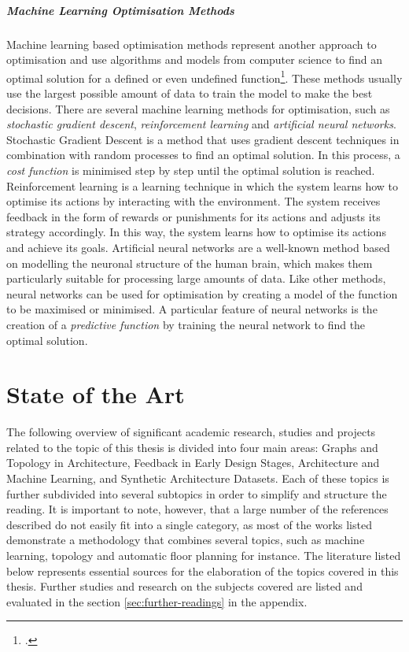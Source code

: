 \documentclass[a4paper, 12pt]{report}
\begin{document}
\paragraph{Machine Learning Optimisation Methods}\label{par:machine-learning-optimisation-methods}

Machine learning based optimisation methods represent another approach to optimisation and use algorithms and models from computer science to find an optimal solution for a defined or even undefined function\footcite{sebestyen2020machine}. These methods usually use the largest possible amount of data to train the model to make the best decisions. There are several machine learning methods for optimisation, such as \textit{stochastic gradient descent}, \textit{reinforcement learning} and \textit{artificial neural networks}. Stochastic Gradient Descent is a method that uses gradient descent techniques in combination with random processes to find an optimal solution. In this process, a \textit{cost function} is minimised step by step until the optimal solution is reached. Reinforcement learning is a learning technique in which the system learns how to optimise its actions by interacting with the environment. The system receives feedback in the form of rewards or punishments for its actions and adjusts its strategy accordingly. In this way, the system learns how to optimise its actions and achieve its goals. Artificial neural networks are a well-known method based on modelling the neuronal structure of the human brain, which makes them particularly suitable for processing large amounts of data. Like other methods, neural networks can be used for optimisation by creating a model of the function to be maximised or minimised. A particular feature of neural networks is the creation of a \textit{predictive function} by training the neural network to find the optimal solution.

\chapter{State of the Art}\label{chap:state-of-the-art}

The following overview of significant academic research, studies and projects related to the topic of this thesis is divided into four main areas: Graphs and Topology in Architecture, Feedback in Early Design Stages, Architecture and Machine Learning, and Synthetic Architecture Datasets. Each of these topics is further subdivided into several subtopics in order to simplify and structure the reading. It is important to note, however, that a large number of the references described do not easily fit into a single category, as most of the works listed demonstrate a methodology that combines several topics, such as machine learning, topology and automatic floor planning for instance. The literature listed below represents essential sources for the elaboration of the topics covered in this thesis. Further studies and research on the subjects covered are listed and evaluated in the section \ref{sec:further-readings} in the appendix.
\end{document}
